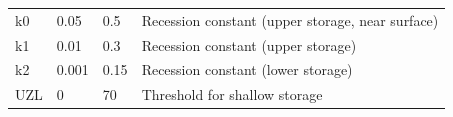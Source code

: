 \documentclass[
]{book}
\begin{document}
\begin{longtable}[]{@{}llll@{}}
\begin{minipage}[t]{0.29\columnwidth}\raggedright
k0\strut
\end{minipage} & \begin{minipage}[t]{0.16\columnwidth}\raggedright
0.05\strut
\end{minipage} & \begin{minipage}[t]{0.13\columnwidth}\raggedright
0.5\strut
\end{minipage} & \begin{minipage}[t]{0.31\columnwidth}\raggedright
Recession constant (upper storage, near surface)\strut
\end{minipage}\tabularnewline
\begin{minipage}[t]{0.29\columnwidth}\raggedright
k1\strut
\end{minipage} & \begin{minipage}[t]{0.16\columnwidth}\raggedright
0.01\strut
\end{minipage} & \begin{minipage}[t]{0.13\columnwidth}\raggedright
0.3\strut
\end{minipage} & \begin{minipage}[t]{0.31\columnwidth}\raggedright
Recession constant (upper storage)\strut
\end{minipage}\tabularnewline
\begin{minipage}[t]{0.29\columnwidth}\raggedright
k2\strut
\end{minipage} & \begin{minipage}[t]{0.16\columnwidth}\raggedright
0.001\strut
\end{minipage} & \begin{minipage}[t]{0.13\columnwidth}\raggedright
0.15\strut
\end{minipage} & \begin{minipage}[t]{0.31\columnwidth}\raggedright
Recession constant (lower storage)\strut
\end{minipage}\tabularnewline
\begin{minipage}[t]{0.29\columnwidth}\raggedright
UZL\strut
\end{minipage} & \begin{minipage}[t]{0.16\columnwidth}\raggedright
0\strut
\end{minipage} & \begin{minipage}[t]{0.13\columnwidth}\raggedright
70\strut
\end{minipage} & \begin{minipage}[t]{0.31\columnwidth}\raggedright
Threshold for shallow storage\strut

\end{minipage}
\end{longtable}
\end{document}
